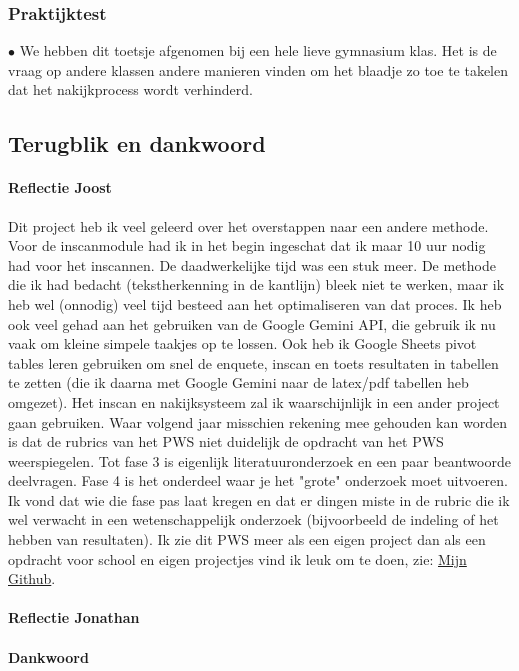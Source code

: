 \documentclass[12pt]{article}
\begin{document}
\begin{multicols}{2}
\subsubsection{Praktijktest}
$\bullet$ We hebben dit toetsje afgenomen bij een hele lieve gymnasium klas. Het is de vraag op andere klassen andere manieren vinden om het blaadje zo toe te takelen dat het nakijkprocess wordt verhinderd.\\
\subsection{Terugblik en dankwoord}

\paragraph*{Reflectie Joost} Dit project heb ik veel geleerd over het overstappen naar een andere methode. Voor de inscanmodule had ik in het begin ingeschat dat ik maar 10 uur nodig had voor het inscannen. De daadwerkelijke tijd was een stuk meer. De methode die ik had bedacht (tekstherkenning in de kantlijn) bleek niet te werken, maar ik heb wel (onnodig) veel tijd besteed aan het optimaliseren van dat proces. Ik heb ook veel gehad aan het gebruiken van de Google Gemini API, die gebruik ik nu vaak om kleine simpele taakjes op te lossen. Ook heb ik Google Sheets pivot tables leren gebruiken om snel de enquete, inscan en toets resultaten in tabellen te zetten (die ik daarna met Google Gemini naar de latex/pdf tabellen heb omgezet). Het inscan en nakijksysteem zal ik waarschijnlijk in een ander project gaan gebruiken. Waar volgend jaar misschien rekening mee gehouden kan worden is dat de rubrics van het PWS niet duidelijk de opdracht van het PWS weerspiegelen. Tot fase 3 is eigenlijk literatuuronderzoek en een paar beantwoorde deelvragen. Fase 4 is het onderdeel waar je het "grote" onderzoek moet uitvoeren. Ik vond dat wie die fase pas laat kregen en dat er dingen miste in de rubric die ik wel verwacht in een wetenschappelijk onderzoek (bijvoorbeeld de indeling of het hebben van resultaten). Ik zie dit PWS meer als een eigen project dan als een opdracht voor school en eigen projectjes vind ik leuk om te doen, zie: \href{https://github.com/TanteJossa}{Mijn Github}.  
\paragraph*{Reflectie Jonathan}
\paragraph*{Dankwoord} 



\end{multicols}
\end{document}
